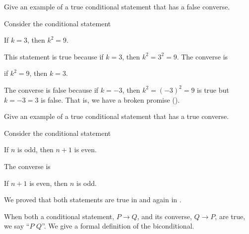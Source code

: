 \begin{exam}
\begin{apart}
            \item Give an example of a true conditional statement that has a false converse.
                \begin{soln}
                    Consider the conditional statement 
                        \begin{center}
                            If $k=3$, then $k^2 = 9$.
                        \end{center}
                    This statement is true because if $k=3$, then $k^2=3^2=9$.
                    The converse is 
                        \begin{center}
                            if $k^2=9$, then $k=3$.
                        \end{center}
                    The converse is false because if $k=-3$, then $k^2=(-3)^2=9$ is true but $k=-3=3$ is false. That is, we have a broken promise ().
                \end{soln}
            \item \label{part_example_true_converse} Give an example of a true conditional statement that has a true converse.
                \begin{soln}
                    Consider the conditional statement 
                        \begin{center}
                            If $n$ is odd, then $n+1$ is even.
                        \end{center}
                    The converse is 
                       \begin{center}
                            If $n+1$ is even, then $n$ is odd.
                        \end{center}
                    We proved that both statements are true in 
                       and again in  . 
                \end{soln}
    \end{apart}
\end{exam}

When both a conditional statement, $P \to Q$, and its converse, $Q \to P$, are true, we say ``$P$  $Q$''.  We give a formal definition of the biconditional.

